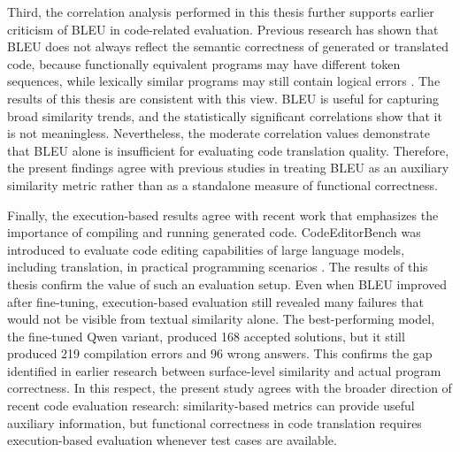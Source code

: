 Third, the correlation analysis performed in this thesis further supports earlier
criticism of BLEU in code-related evaluation. Previous research has shown that
BLEU does not always reflect the semantic correctness of generated or translated
code, because functionally equivalent programs may have different token sequences,
while lexically similar programs may still contain logical errors
\cite{tran2019ruby, evtikhiev2022bleu}. The results of this thesis are consistent
with this view. BLEU is useful for capturing broad similarity trends, and the
statistically significant correlations show that it is not meaningless. Nevertheless,
the moderate correlation values demonstrate that BLEU alone is insufficient for
evaluating code translation quality. Therefore, the present findings agree with
previous studies in treating BLEU as an auxiliary similarity metric rather than as
a standalone measure of functional correctness.

Finally, the execution-based results agree with recent work that emphasizes the
importance of compiling and running generated code. CodeEditorBench was
introduced to evaluate code editing capabilities of large language models, including
translation, in practical programming scenarios \cite{codeeditorbench}. The results
of this thesis confirm the value of such an evaluation setup. Even when BLEU
improved after fine-tuning, execution-based evaluation still revealed many failures
that would not be visible from textual similarity alone. The best-performing model,
the fine-tuned Qwen variant, produced 168 accepted solutions, but it still produced
219 compilation errors and 96 wrong answers. This confirms the gap identified in
earlier research between surface-level similarity and actual program correctness.
In this respect, the present study agrees with the broader direction of recent code
evaluation research: similarity-based metrics can provide useful auxiliary
information, but functional correctness in code translation requires execution-based
evaluation whenever test cases are available.